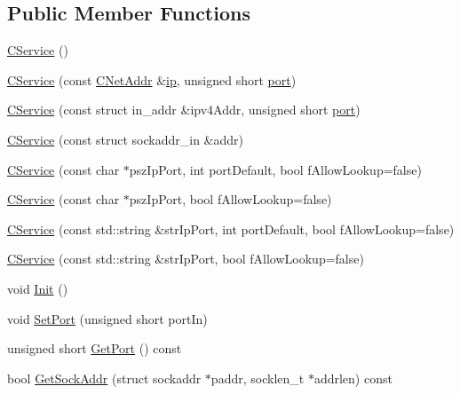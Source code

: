 \subsection*{Public Member Functions}
\begin{DoxyCompactItemize}
\item 
\mbox{\hyperlink{class_c_service_a3003da1c50f2135123ebb3109340b9b2}{C\+Service}} ()
\item 
\mbox{\hyperlink{class_c_service_a43a0d18387ce3837d48020da47a1087c}{C\+Service}} (const \mbox{\hyperlink{class_c_net_addr}{C\+Net\+Addr}} \&\mbox{\hyperlink{class_c_net_addr_acff7ce68f33f8dfbfe6d79d80928d417}{ip}}, unsigned short \mbox{\hyperlink{class_c_service_aef17734203dc2125cbdf4d23e50be410}{port}})
\item 
\mbox{\hyperlink{class_c_service_a1fcc14e589f6d3e92b43707a5f71368f}{C\+Service}} (const struct in\+\_\+addr \&ipv4\+Addr, unsigned short \mbox{\hyperlink{class_c_service_aef17734203dc2125cbdf4d23e50be410}{port}})
\item 
\mbox{\hyperlink{class_c_service_aa54fd9204530445647cd3d45056881e9}{C\+Service}} (const struct sockaddr\+\_\+in \&addr)
\item 
\mbox{\hyperlink{class_c_service_a75b2a3cfa16642b0fcd74382203a9fdc}{C\+Service}} (const char $\ast$psz\+Ip\+Port, int port\+Default, bool f\+Allow\+Lookup=false)
\item 
\mbox{\hyperlink{class_c_service_ab8f5f4ae4e99a4edad8ba48642e36137}{C\+Service}} (const char $\ast$psz\+Ip\+Port, bool f\+Allow\+Lookup=false)
\item 
\mbox{\hyperlink{class_c_service_a677f74b3520148f3e47a19bb9986922b}{C\+Service}} (const std\+::string \&str\+Ip\+Port, int port\+Default, bool f\+Allow\+Lookup=false)
\item 
\mbox{\hyperlink{class_c_service_a19a7a713dd9a30b2f78260e61d9a2604}{C\+Service}} (const std\+::string \&str\+Ip\+Port, bool f\+Allow\+Lookup=false)
\item 
void \mbox{\hyperlink{class_c_service_aee07d7f18e672f16d26359e3cab779ff}{Init}} ()
\item 
void \mbox{\hyperlink{class_c_service_a3dedc3f12aa21bdbf1068b054d3e3d39}{Set\+Port}} (unsigned short port\+In)
\item 
unsigned short \mbox{\hyperlink{class_c_service_a71caa0d6aa6ab12758bde8b6a6bcfd2a}{Get\+Port}} () const
\item 
bool \mbox{\hyperlink{class_c_service_ac4c6d655fab3af40937f0b0c65581745}{Get\+Sock\+Addr}} (struct sockaddr $\ast$paddr, socklen\+\_\+t $\ast$addrlen) const

\end{DoxyCompactItemize}
